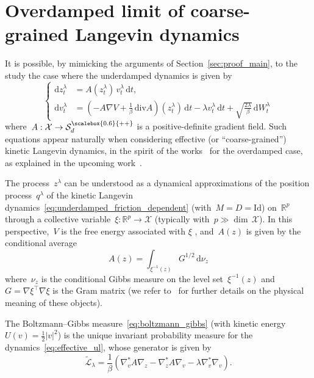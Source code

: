 \documentclass[10pt]{article}
\newcommand{\cL}{\mathcal{L}}
\renewcommand{\d}{\mathrm{d}}
\renewcommand{\div}{\mathrm{div}}
\newcommand{\R}{\mathbb{R}}
\newcommand{\cX}{\mathcal{X}}
\newcommand{\cSpd}{\mathcal{S}_d^{\scalebox{0.6}{++}}}
\newcommand{\1}{\mathbbm 1}
\newcommand{\Id}{\mathrm{Id}}
\begin{document}
\section{Overdamped limit of coarse-grained Langevin dynamics}
\label{sec:coarse_graining}
    It is possible, by mimicking the arguments of Section~\ref{sec:proof_main}, to the study the case where the underdamped dynamics is given by
    \begin{equation}
        \label{eq:effective_ul}
        \left\{\begin{aligned}
        \d z_t^\lambda &= A(z_t^\lambda)\,v_t^\lambda\,\d t,\\
        \d v_t^\lambda &= \left(-A\nabla V + \frac1\beta\,\div A\right)(z_t^\lambda)\,\d t - \lambda v_t^\lambda\,\d t + \sqrt{\frac{2\lambda}{\beta}}\,\d W_t^\lambda
        \end{aligned}\right.
    \end{equation}
    where~$A:\cX\to\cSpd$ is a positive-definite gradient field. Such equations appear naturally when considering effective (or ``coarse-grained'') kinetic Langevin dynamics, in the spirit of the works~\cite{LL10,ZHS16} for the overdamped case, as explained in the upcoming work~\cite{LSZ26}.

    The process~$z^\lambda$ can be understood as a dynamical approximations of the position process~$q^\lambda$ of the kinetic Langevin dynamics~\eqref{eq:underdamped_friction_dependent} (with~$M=D=\Id$) on~$\R^p$ through a collective variable~$\xi:\R^p\to\cX$ (typically with~$p\gg \dim\,\cX$).
    In this perspective,~$V$ is the free energy associated with $\xi$ , and~$A(z)$ is given by the conditional average
    $$
    A(z) = \int_{\xi^{-1}(z)} G^{1/2}\,\d\nu_z
    $$
    where~$\nu_z$ is the conditional Gibbs measure on the level set~$\xi^{-1}(z)$ and~$G = \nabla\xi^\top\nabla\xi$ is the Gram matrix (we refer to~\cite[Section 3.2.1]{LRS10} for further details on the physical meaning of these objects).

    The Boltzmann--Gibbs measure~\eqref{eq:boltzmann_gibbs} (with kinetic energy~$U(v)=\frac12|v|^2$) is the unique invariant probability measure for the dynamics~\eqref{eq:effective_ul}, whose generator is given by
    \begin{equation}
        \label{eq:cg_generator}
        \widetilde{\cL}_\lambda = \frac1\beta\left(\nabla_v^*A\nabla_z-\nabla_z^*A\nabla_v-\lambda\nabla_v^*\nabla_v\right).
    \end{equation}
\end{document}
